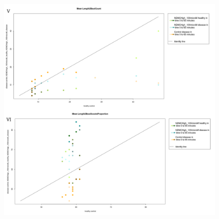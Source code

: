 \documentclass[a4paper,12pt]{article}
\begin{document}
\begin{figure}[h!]
\begin{center}
\includegraphics[width=15cm,height=16cm]{ApoHighCountScootsN.png}
\end{center}
\end{figure}
\end{document}
